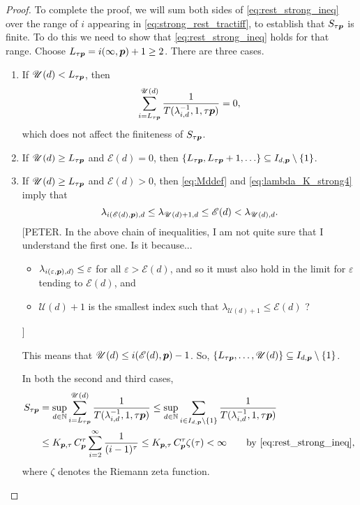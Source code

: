 \documentclass[sort&compress]{elsarticle}
\newcommand{\theM}{\mathscr{E}}
\newcommand{\theUB}{\mathscr{U}}
\newcommand{\peter}[1]{\begingroup\color{violet}#1\endgroup}
\begin{document}
\begin{proof}
To complete the proof, we will sum both sides of \eqref{eq:rest_strong_ineq} over the range of $i$ appearing in \eqref{eq:strong_rest_tractiff}, to establish that $S_{\tau\boldsymbol{p}}$ is finite.  To do this we need to show that \eqref{eq:rest_strong_ineq} holds for that range.  Choose $L_{\tau\boldsymbol{p}} = i(\infty,\boldsymbol{p}) +1 \ge 2$. There are three cases.
\begin{enumerate}
\renewcommand{\labelenumi}{\roman{enumi})}


\item If $\theUB(d) < L_{\tau\vp}$, then 
\[
\sum_{i = L_{\tau\vp}}^{\theUB(d)} \frac{1}{T (\lambda_{i,d}^{-1},1, \tau \vp)} = 0,
\]
which does not affect the finiteness of $S_{\tau\boldsymbol{p}}$.

\item If $\theUB(d) \ge L_{\tau\vp}$ and $\theM(d) = 0$, then $\{L_{\tau\boldsymbol{p}},  L_{\tau\boldsymbol{p}} + 1, \ldots \} \subseteq I_{d,\boldsymbol{p}} \setminus \{1\}$.  

\item If $\theUB(d) \ge L_{\tau\vp}$ and $\theM(d) >0$, then \eqref{eq:Mddef} and \eqref{eq:lambda_K_strong4} imply that
\[
\lambda_{i(\theM(d),\vp),d} \le \lambda_{\theUB(d)+1,d} \le \theM(d) < \lambda_{\theUB(d),d}.
\]
\peter{
[PETER. In the above chain of inequalities, I am not quite sure that I understand the first one. Is it because...
\begin{itemize}
    \item $\lambda_{i(\varepsilon,\boldsymbol{p}),d)} \le \varepsilon$ for all $\varepsilon>\theM(d)$, and so it must also hold in the limit for $\varepsilon$ tending to $\theM(d)$, and
    \item $\theUB (d) +1$ is the smallest index such that $\lambda_{\theUB (d) +1} \le \theM(d)$ ?
\end{itemize}]

}
This means that $\theUB(d) \le i(\theM(d),\vp)-1$.  So, $\{L_{\tau\vp}, \ldots, \theUB(d)\} \subseteq I_{d,\vp} \setminus \{1\}$. 

In both the second and third cases,
\begin{align*}
S_{\tau\vp} & = \sup_{d\in\naturals} \sum_{i = L_{\tau\vp}}^{\theUB(d)} \frac{1}{T (\lambda_{i,d}^{-1},1, \tau \vp)}
\le 
\sup_{d\in\naturals} \sum_{i \in I_{d,\vp} \setminus\{1\} } \frac{1}{T (\lambda_{i,d}^{-1},1, \tau \vp)} \\
&  \le  K_{\vp,\tau}\, C_{\vp}^\tau
\sum_{i=2}^\infty \frac{1}{(i-1)^\tau}
 \le K_{\vp,\tau}\, C_{\vp}^\tau
\zeta (\tau) 
 < \infty \qquad \text{by \eqref{eq:rest_strong_ineq},}
\end{align*}
where $\zeta$ denotes the Riemann zeta function.


\end{enumerate}
\end{proof}
\end{document}
